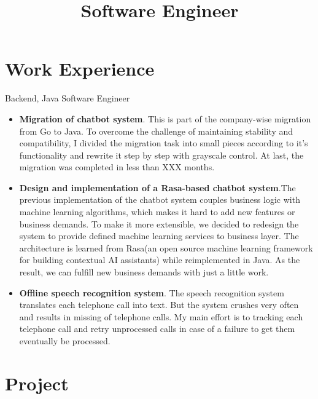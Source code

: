 \documentclass[11pt,a4paper]{moderncv}
\title{Software Engineer}
\begin{document}
\maketitle


\section{Work Experience}
{Backend, Java}
{Software Engineer}{}{
\begin{itemize}
	\item \textbf{Migration of chatbot system}. This is part of the company-wise migration from Go to Java. To overcome the challenge of maintaining stability and compatibility, I divided the migration task into small pieces according to it’s functionality and rewrite it step by step with grayscale control. At last, the migration was completed in less than XXX months.
	\item \textbf{Design and implementation of a Rasa-based chatbot system}.The previous implementation of the chatbot system couples business logic with machine learning algorithms, which makes it hard to add new features or business demands. To make it more extensible, we decided to redesign the system to provide defined machine learning services to business layer. The architecture is learned from Rasa(an open source machine learning framework for building contextual AI assistants) while reimplemented in Java. As the result, we can fulfill new business demands with just a little work.
	\item \textbf{Offline speech recognition system}. The speech recognition system translates each telephone call into text. But the system crushes very often and results in missing of telephone calls. My main effort is to tracking each telephone call and retry unprocessed calls in case of a failure to get them eventually be processed.
\end{itemize}
}

\section{Project}
\end{document}
